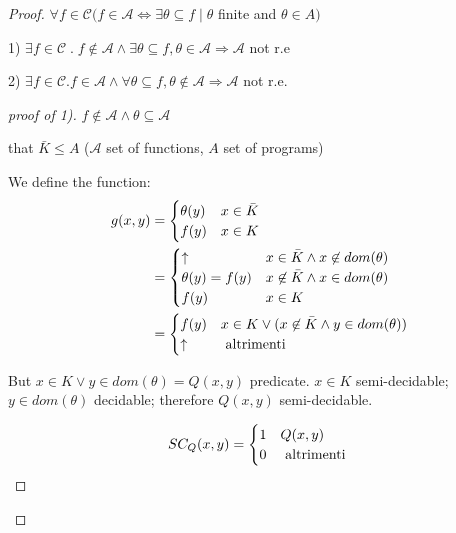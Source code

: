 \begin{proof}
  
  $ \forall f \in \mathcal{C} (f \in \mathcal{A} \Leftrightarrow
  \exists\theta\subseteq f \mid \theta $ finite and $ \theta\in A)$
  
  1)
  $ \exists f \in \mathcal{C} \; . \; f \not\in \mathcal{A} \land
  \exists\theta\subseteq f, \theta\in\mathcal{A} \Rightarrow
  \mathcal{A}$ not r.e

  2)
  $ \exists f \in \mathcal{C}. f\in\mathcal{A} \land
  \forall\theta\subseteq f, \theta\not\in\mathcal{A}\Rightarrow
  \mathcal{A} $ not r.e.

  \begin{proof}[proof of 1)]

    $ f\not\in \mathcal{A} \land \theta\subseteq \mathcal{A}$

    that $
    \bar{K}\leq A $ ($ \mathcal{A} $ set of functions, $A$ set of
    programs)

    We define the function:
    \begin{equation*}
      \begin{aligned}
        g(x,y) & = \begin{cases}
          \theta(y) & x \in \bar{K} \\
          f(y) & x \in K
        \end{cases} \\
               & = \begin{cases}
                 \uparrow & x \in \bar{K} \land x \not\in dom(\theta) \\
                 \theta(y) = f(y) & x \not\in \bar{K} \land x \in dom(\theta) \\
                 f(y) & x\in K
               \end{cases}\\
               &= \begin{cases}
                 f(y) & x \in K\lor(x\not\in\bar{K}\land y\in dom(\theta)) \\
                 \uparrow & $ altrimenti $
               \end{cases}
      \end{aligned}
    \end{equation*}

    But $ x\in K\lor y\in dom(\theta) = Q(x,y)$ predicate. $ x\in K $
    semi-decidable; $ y \in dom(\theta) $ decidable; therefore $ Q(x,y) $
    semi-decidable.

    \begin{equation*}
      SC_Q(x,y) = \begin{cases}
        1 & Q(x,y) \\
        0 & $ altrimenti $
      \end{cases}
    \end{equation*}


\end{proof}
\end{proof}
